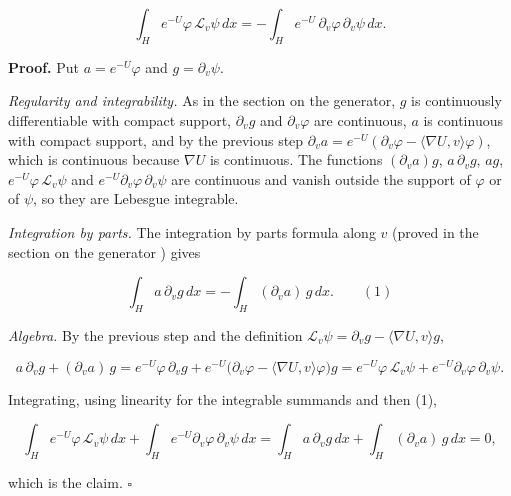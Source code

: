 \documentclass[11pt,a4paper]{article}
\begin{document}
\[\int_He^{-U}\varphi\,\mathcal L_v\psi\,dx=-\int_He^{-U}\,\partial_v\varphi\,\partial_v\psi\,dx.\]


\textbf{Proof.} Put \(a=e^{-U}\varphi\) and \(g=\partial_v\psi\).




\emph{Regularity and integrability.} As in the section on the generator, \(g\) is continuously differentiable with compact support, \(\partial_vg\) and \(\partial_v\varphi\) are continuous, \(a\) is continuous with compact support, and by the previous step \(\partial_va=e^{-U}(\partial_v\varphi-\langle\nabla U,v\rangle\varphi)\), which is continuous because \(\nabla U\) is continuous. The functions \((\partial_va)g\), \(a\,\partial_vg\), \(ag\), \(e^{-U}\varphi\,\mathcal L_v\psi\) and \(e^{-U}\partial_v\varphi\,\partial_v\psi\) are continuous and vanish outside the support of \(\varphi\) or of \(\psi\), so they are Lebesgue integrable.




\emph{Integration by parts.} The integration by parts formula along \(v\) (proved in the section on the generator \cite[Section~3.46.6]{LangevinLean2026ULASC}) gives


\[\int_Ha\,\partial_vg\,dx=-\int_H(\partial_va)\,g\,dx.\qquad(1)\]


\emph{Algebra.} By the previous step and the definition \(\mathcal L_v\psi=\partial_vg-\langle\nabla U,v\rangle g\),


\[a\,\partial_vg+(\partial_va)\,g=e^{-U}\varphi\,\partial_vg+e^{-U}\bigl(\partial_v\varphi-\langle\nabla U,v\rangle\varphi\bigr)g=e^{-U}\varphi\,\mathcal L_v\psi+e^{-U}\partial_v\varphi\,\partial_v\psi.\]


Integrating, using linearity for the integrable summands and then (1),


\[\int_He^{-U}\varphi\,\mathcal L_v\psi\,dx+\int_He^{-U}\partial_v\varphi\,\partial_v\psi\,dx=\int_Ha\,\partial_vg\,dx+\int_H(\partial_va)\,g\,dx=0,\]


which is the claim. \(\square\)
\end{document}
